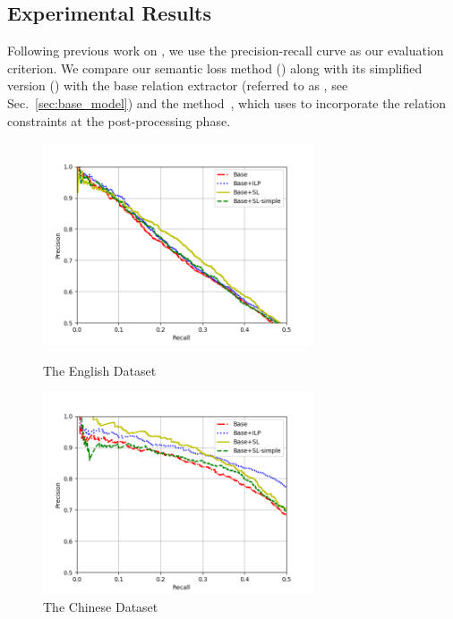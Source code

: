 \subsection{Experimental Results}
Following previous work on \RE, we use the precision-recall curve as our evaluation criterion.
We compare our semantic loss method (\SL) along with its simplified version (\SLsimple) with the base relation extractor (referred to as \base, see Sec.~\ref{sec:base_model}) and the \ILP method~\cite{chen2014encoding}, which uses \ILP to incorporate the relation constraints at the post-processing phase.
\begin{figure}[htbp]
	\centering
	\begin{minipage}[t]{0.48\textwidth}
		\centering
		\includegraphics[width=8cm]{./result-figure/DBpedia-CNN-result.png}
		\caption{The English Dataset}
		\label{fig:dbpedia}
	\end{minipage}
	\begin{minipage}[t]{0.48\textwidth}
		\centering
		\includegraphics[width=8cm]{./result-figure/Chinese-CNN-result.png}
		\caption{The Chinese Dataset}
		\label{fig:chinese}
	\end{minipage}
\end{figure}

